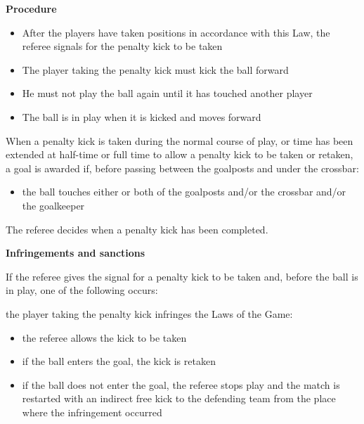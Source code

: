 {\bigskip

{\bfseries Procedure}

\headlinebox

\begin{itemize}
\item After the players have taken positions in accordance with this Law, the
referee signals for the penalty kick to be taken
\item The player taking the penalty kick must kick the ball forward
\item He must not play the ball again until it has touched another player
\item The ball is in play when it is kicked and moves forward
\end{itemize}

When a penalty kick is taken during the normal course of play, or time
has been extended at half-time or full time to allow a penalty kick to
be taken or retaken, a goal is awarded if, before passing between the
goalposts and under the crossbar:

\begin{itemize}
\item the ball touches either or both of the goalposts and/or the crossbar
and/or the goalkeeper 
\end{itemize}

\bigskip

The referee decides when a penalty kick has been completed.

\bigskip

{\bfseries Infringements and sanctions }

\headlinebox

If the referee gives the signal for a penalty kick to be taken and,
before the ball is in play, one of the following occurs:

the player taking the penalty kick infringes the Laws of the Game:

\begin{itemize}
\item the referee allows the kick to be taken
\item if the ball enters the goal, the kick is retaken
\item if the ball does not enter the goal, the referee stops play and the
match is restarted with an indirect free kick to the defending team
from the place where the infringement occurred
\end{itemize}

\bigskip

}
